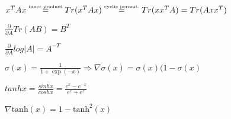 \begin{inparaitem}[\color{red}\textbullet]
	\item $x^T A x \stackrel{\text{\tiny inner product}}{=} Tr(x^T A x) \stackrel{\text{\tiny cyclic permut.}}{=} Tr(x x^T A) = Tr(A x x^T)$ \\
	\item $\tfrac{\partial}{\partial A} Tr(AB) {=} B^T$
	\item $\frac{\partial}{\partial A} log|A| {=} A^{-T}$ \\
	\item $\sigma(x) = \frac{1}{1+\exp(-x)} \Rightarrow \nabla \sigma(x)=\sigma(x)(1-\sigma(x) $ \\
	\item $tanhx {=} \frac{sinhx}{coshx} {=} \frac{e^{x}-e^{-x}}{e^{x} + e^{x}}$
	\item $\nabla \text{tanh}(x) = 1-\text{tanh}^2(x)$ 

\end{inparaitem}

